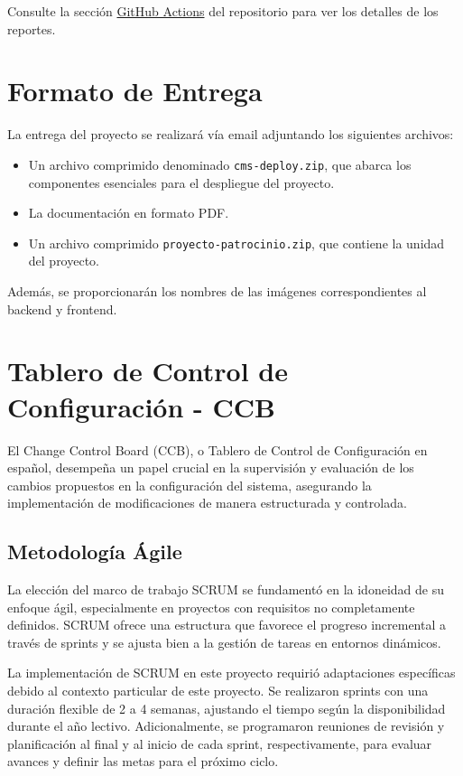 Consulte la sección \href{https://github.com/proyecto-patrocinio/proyecto-patrocinio/actions}{GitHub Actions} del repositorio para ver los detalles de los reportes.




\section{Formato de Entrega}
La entrega del proyecto se realizará vía email adjuntando los siguientes archivos:

\begin{itemize}
    \item Un archivo comprimido denominado \texttt{cms-deploy.zip}, que abarca los componentes esenciales para el despliegue del proyecto.
    \item La documentación en formato PDF.
    \item Un archivo comprimido \texttt{proyecto-patrocinio.zip}, que contiene la unidad del proyecto.
\end{itemize}

Además, se proporcionarán los nombres de las imágenes correspondientes al backend y frontend.




\section{Tablero de Control de Configuración - CCB}

El Change Control Board (CCB), o Tablero de Control de Configuración en español, desempeña un papel crucial en la supervisión y evaluación de los cambios propuestos en la configuración del sistema, asegurando la implementación de modificaciones de manera estructurada y controlada.


\subsection{Metodología Ágile}
La elección del marco de trabajo SCRUM se fundamentó en la idoneidad de su enfoque ágil, especialmente en proyectos con requisitos no completamente definidos. SCRUM ofrece una estructura que favorece el progreso incremental a través de sprints y se ajusta bien a la gestión de tareas en entornos dinámicos.

La implementación de SCRUM en este proyecto requirió adaptaciones específicas debido al contexto particular de este proyecto. Se realizaron sprints con una duración flexible de 2 a 4 semanas, ajustando el tiempo según la disponibilidad durante el año lectivo. Adicionalmente, se programaron reuniones de revisión y planificación al final y al inicio de cada sprint, respectivamente, para evaluar avances y definir las metas para el próximo ciclo.

